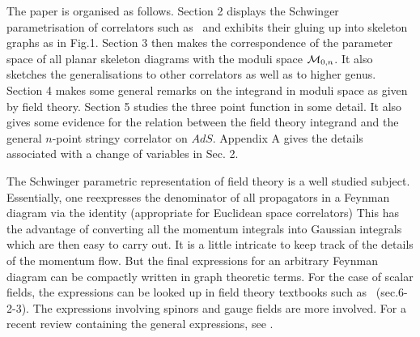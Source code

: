 The paper is organised as follows. Section 2 displays the
Schwinger parametrisation of correlators such as \ncorr\ and
exhibits their gluing up into skeleton graphs as in Fig.1. Section
3 then makes the correspondence of the parameter space of all
planar skeleton diagrams with the moduli space ${\cal M}_{0,n}$.
It also sketches the generalisations to other correlators as well
as to higher genus. Section 4 makes some general remarks on the integrand
in moduli space as given by field theory. Section 5 studies
the three point function in some detail. It also gives some evidence
for the relation between the field theory integrand and the general
$n$-point stringy correlator on $AdS$.  
Appendix A gives the details 
associated with a change of variables in Sec. 2. 


 
The Schwinger parametric representation of field theory is a well
studied subject. Essentially, one reexpresses the denominator of
all propagators in a Feynman diagram via the identity (appropriate
for Euclidean space correlators) 
\eqn{} 
This has the
advantage of converting all the momentum integrals into Gaussian
integrals which are then easy to carry out. It is a little
intricate to keep track of the details of the momentum flow. But
the final expressions for an arbitrary Feynman diagram can be
compactly written in graph theoretic terms. For the case of scalar
fields, the expressions can be looked up in field theory textbooks
such as \iz\ (sec.6-2-3). The expressions involving spinors and
gauge fields are more involved. For a recent review containing the
general expressions, see \lam\lama .

